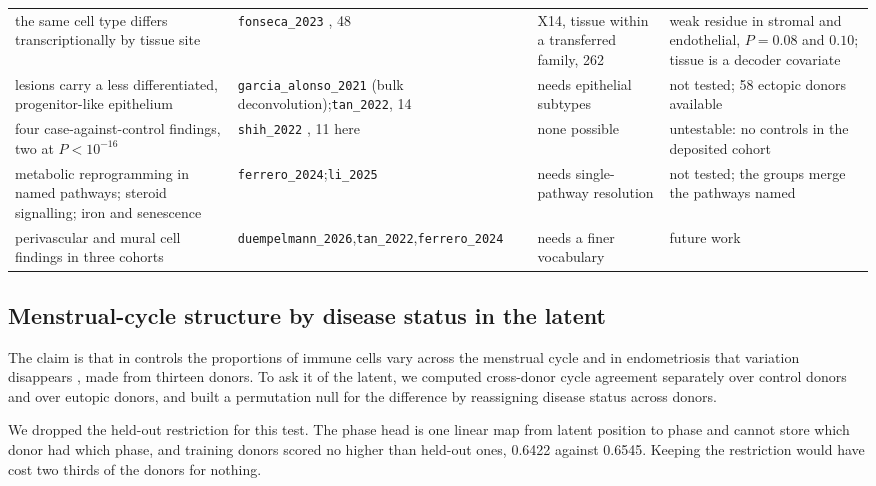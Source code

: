 \begin{table}[p]
\begin{tabular}{@{}p{40mm}p{30mm}p{38mm}p{44mm}@{}}
the same cell type differs transcriptionally by tissue site & \texttt{fonseca\_2023} \citep{fonseca2023endometriosis}, 48 & X14, tissue within a transferred family, 262 & weak residue in stromal and endothelial, $P = 0.08$ and $0.10$; tissue is a decoder covariate \\
lesions carry a less differentiated, progenitor-like epithelium & \texttt{garcia\_alonso\_2021} \citep{garciaalonso2021endometrium}\newline (bulk deconvolution);\newline \texttt{tan\_2022}, 14 & needs epithelial subtypes & not tested; 58 ectopic donors available \\
four case-against-control findings, two at $P < 10^{-16}$ & \texttt{shih\_2022} \citep{shih2022menstrual}, 11 here & none possible & untestable: no controls in the deposited cohort \\
metabolic reprogramming in named pathways; steroid signalling; iron and senescence & \texttt{ferrero\_2024};\newline \texttt{li\_2025} \citep{li2025iron} & needs single-pathway resolution & not tested; the groups merge the pathways named \\
perivascular and mural cell findings in three cohorts & \texttt{duempelmann\_2026},\newline \texttt{tan\_2022},\newline \texttt{ferrero\_2024} & needs a finer vocabulary & future work \\
\bottomrule
\end{tabular}
\end{table}

\subsection{Menstrual-cycle structure by disease status in the latent}

The claim is that in controls the proportions of immune cells vary across
the menstrual cycle and in endometriosis that variation disappears
\citep{huang2023immune}, made from thirteen donors. To ask it of the
latent, we computed cross-donor cycle agreement separately over control
donors and over eutopic donors, and built a permutation null for the
difference by reassigning disease status across donors.

We dropped the held-out restriction for this test. The phase head is one
linear map from latent position to phase and cannot store which donor had
which phase, and training donors scored no higher than held-out ones,
0.6422 against 0.6545. Keeping the restriction would have cost two thirds
of the donors for nothing.

